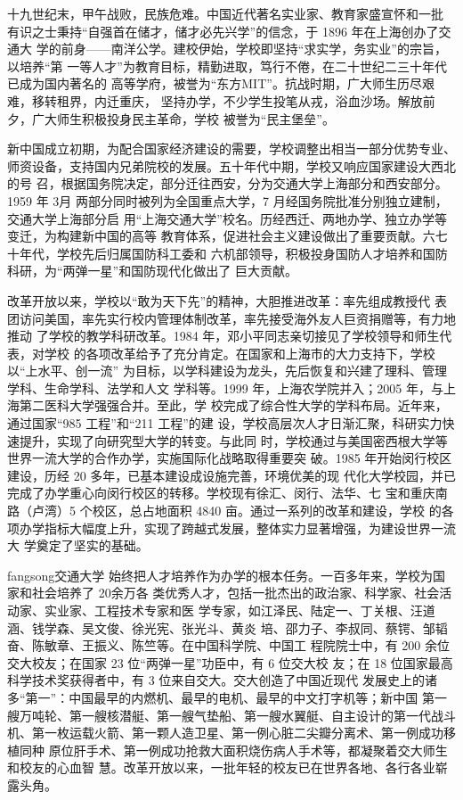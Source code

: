 {\songti 十九世纪末，甲午战败，民族危难。中国近代著名实业家、教育家盛宣怀和一批
  有识之士秉持“自强首在储才，储才必先兴学”的信念，于 1896 年在上海创办了交通大
  学的前身——南洋公学。建校伊始，学校即坚持“求实学，务实业”的宗旨，以培养“第
  一等人才”为教育目标，精勤进取，笃行不倦，在二十世纪二三十年代已成为国内著名的
  高等学府，被誉为“东方MIT”。抗战时期，广大师生历尽艰难，移转租界，内迁重庆，
  坚持办学，不少学生投笔从戎，浴血沙场。解放前夕，广大师生积极投身民主革命，学校
  被誉为“民主堡垒”。}

{\heiti 新中国成立初期，为配合国家经济建设的需要，学校调整出相当一部分优势专业、
  师资设备，支持国内兄弟院校的发展。五十年代中期，学校又响应国家建设大西北的号
  召，根据国务院决定，部分迁往西安，分为交通大学上海部分和西安部分。1959 年 3月
  两部分同时被列为全国重点大学，7 月经国务院批准分别独立建制，交通大学上海部分启
  用“上海交通大学”校名。历经西迁、两地办学、独立办学等变迁，为构建新中国的高等
  教育体系，促进社会主义建设做出了重要贡献。六七十年代，学校先后归属国防科工委和
  六机部领导，积极投身国防人才培养和国防科研，为“两弹一星”和国防现代化做出了
  巨大贡献。}

{\kaishu 改革开放以来，学校以“敢为天下先”的精神，大胆推进改革：率先组成教授代
  表团访问美国，率先实行校内管理体制改革，率先接受海外友人巨资捐赠等，有力地推动
  了学校的教学科研改革。1984 年，邓小平同志亲切接见了学校领导和师生代表，对学校
  的各项改革给予了充分肯定。在国家和上海市的大力支持下，学校以“上水平、创一流”
  为目标，以学科建设为龙头，先后恢复和兴建了理科、管理学科、生命学科、法学和人文
  学科等。1999 年，上海农学院并入；2005 年，与上海第二医科大学强强合并。至此，学
  校完成了综合性大学的学科布局。近年来，通过国家“985 工程”和“211 工程”的建
  设，学校高层次人才日渐汇聚，科研实力快速提升，实现了向研究型大学的转变。与此同
  时，学校通过与美国密西根大学等世界一流大学的合作办学，实施国际化战略取得重要突
  破。1985 年开始闵行校区建设，历经 20 多年，已基本建设成设施完善，环境优美的现
  代化大学校园，并已完成了办学重心向闵行校区的转移。学校现有徐汇、闵行、法华、七
  宝和重庆南路（卢湾）5 个校区，总占地面积 4840 亩。通过一系列的改革和建设，学校
  的各项办学指标大幅度上升，实现了跨越式发展，整体实力显著增强，为建设世界一流大
  学奠定了坚实的基础。}

{\ifcsname fangsong\endcsname\fangsong\else[无 \cs{fangsong} 字体。]\fi 交通大学
  始终把人才培养作为办学的根本任务。一百多年来，学校为国家和社会培养了 20余万各
  类优秀人才，包括一批杰出的政治家、科学家、社会活动家、实业家、工程技术专家和医
  学专家，如江泽民、陆定一、丁关根、汪道涵、钱学森、吴文俊、徐光宪、张光斗、黄炎
  培、邵力子、李叔同、蔡锷、邹韬奋、陈敏章、王振义、陈竺等。在中国科学院、中国工
  程院院士中，有 200 余位交大校友；在国家 23 位“两弹一星”功臣中，有 6 位交大校
  友；在 18 位国家最高科学技术奖获得者中，有 3 位来自交大。交大创造了中国近现代
  发展史上的诸多“第一”：中国最早的内燃机、最早的电机、最早的中文打字机等；新中国
  第一艘万吨轮、第一艘核潜艇、第一艘气垫船、第一艘水翼艇、自主设计的第一代战斗
  机、第一枚运载火箭、第一颗人造卫星、第一例心脏二尖瓣分离术、第一例成功移植同种
  原位肝手术、第一例成功抢救大面积烧伤病人手术等，都凝聚着交大师生和校友的心血智
  慧。改革开放以来，一批年轻的校友已在世界各地、各行各业崭露头角。}


